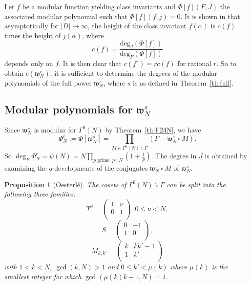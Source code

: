 \documentclass[12pt,twoside,leqno]{article}
\newtheorem{proposition}[theorem]{Proposition}
\numberwithin{equation}{section}
\renewcommand{\leq}{\leqslant}
\newcommand{\w}{\mathfrak w}
\newcommand {\PhiNc}{\Phi_N^{\mathrm c}}
\begin{document}
Let $f$ be a modular function yielding class invariants and $\Phi[f](F, J)$ the
associated modular polynomial such that $\Phi[f] (f, j) = 0$. It is shown in
\cite{EnMo02} that asymptotically for $|D| \to \infty$, the height of the
class invariant $f(\alpha)$ is $c (f)$ times the height of $j (\alpha)$,
where
\begin {equation}
\label {eq:c}
c(f) = \frac{\mathrm{deg}_J(\Phi[f])}{\mathrm{deg}_F(\Phi[f])}
\end {equation}
depends only on $f$. It is then clear that $c (f^r) = r c(f)$ for rational $r$.
So to obtain $c (\w_N^e)$, it is sufficient to determine the degrees of the
modular polynomials of the full power $\w_N^s$, where $s$ is as defined in
Theorem~\ref {th:full}.


\subsection{Modular polynomials for \texorpdfstring {$\w_N^s$}{wNs}}

Since $\w_N^s$ is modular for $\Gamma^0 (N)$ by Theorem~\ref {th:F24N},
we have
\[
\PhiNc := \Phi [\w_N^s]
= \prod_{M \in \Gamma^0(N) \backslash \Gamma} (F - \w_N^s \circ M).
\]
So $\deg_F \PhiNc = \psi (N)
= N \prod_{p \text { prime, } p \mid N} \left( 1 + \frac {1}{p} \right)$.
The degree in $J$ is obtained by examining the $q$-developments
of the conjugates $\w_N^s \circ M$ of $\w_N^s$.

\begin{proposition}[Oesterl\'e]
The cosets of $\Gamma^0(N) \backslash \Gamma$ can be split into the
following three families:
$$T^{\nu} = \left(\begin{array}{cc} 1 & \nu \\ 0 & 1 \\ \end{array}\right), 0
\leq \nu < N,$$
$$S = \left(\begin{array}{cc} 0 & -1 \\ 1 & 0 \\ \end{array}\right),$$
$$M_{k, k'} = \left(\begin{array}{cc} k & k k'-1 \\1 & k'\\\end{array}\right)$$
with $1 < k < N$, $\gcd(k, N) > 1$ and $0 \leq k' < \mu(k)$ where
$\mu(k)$ is the smallest integer for which $\gcd(\mu(k) k -1, N)=1$.
\end{proposition}
\end{document}
